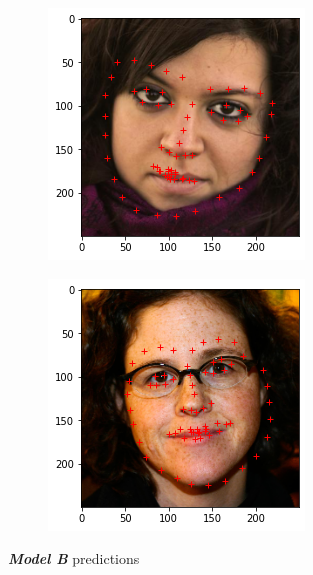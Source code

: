 \documentclass{article}
\begin{document}
\begin{figure}[h]
  \centering
  \begin{subfigure}[b]{0.35\textwidth}
    \includegraphics[width=\textwidth]{B1}
  \end{subfigure}
  \begin{subfigure}[b]{.35\textwidth}
    \includegraphics[width=\textwidth]{B5}
  \end{subfigure}
  \caption{\textbf{\textit{Model B}} predictions}
  \label{fig:model-B}
\end{figure}
\end{document}
